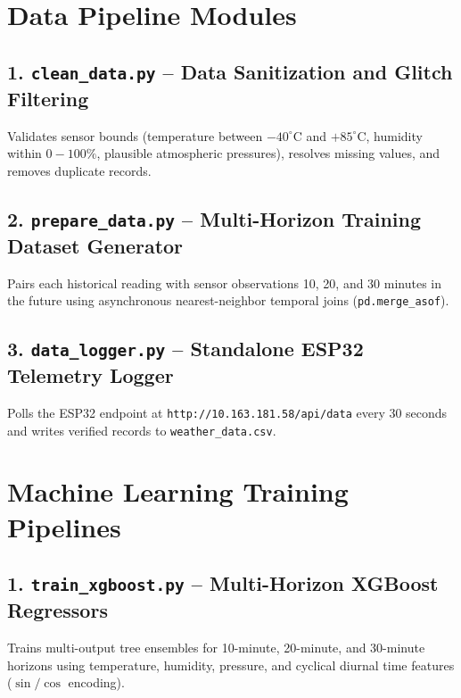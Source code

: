 \documentclass[11pt,a4paper]{article}
\begin{document}
\newpage
\section{Data Pipeline Modules}

\subsection{1. \texttt{clean\_data.py} -- Data Sanitization and Glitch Filtering}
Validates sensor bounds (temperature between $-40^\circ\text{C}$ and $+85^\circ\text{C}$, humidity within $0-100\%$, plausible atmospheric pressures), resolves missing values, and removes duplicate records.



\newpage
\subsection{2. \texttt{prepare\_data.py} -- Multi-Horizon Training Dataset Generator}
Pairs each historical reading with sensor observations 10, 20, and 30 minutes in the future using asynchronous nearest-neighbor temporal joins (\texttt{pd.merge\_asof}).



\newpage
\subsection{3. \texttt{data\_logger.py} -- Standalone ESP32 Telemetry Logger}
Polls the ESP32 endpoint at \texttt{http://10.163.181.58/api/data} every 30 seconds and writes verified records to \texttt{weather\_data.csv}.



\newpage
\section{Machine Learning Training Pipelines}

\subsection{1. \texttt{train\_xgboost.py} -- Multi-Horizon XGBoost Regressors}
Trains multi-output tree ensembles for 10-minute, 20-minute, and 30-minute horizons using temperature, humidity, pressure, and cyclical diurnal time features ($\sin/\cos$ encoding).
\end{document}

